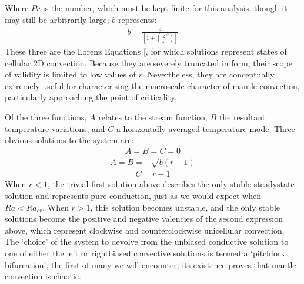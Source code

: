 \documentclass[letterpaper,10pt,english]{jupyterBook}
\begin{document}
\sphinxAtStartPar
Where \(Pr\) is the  number, which must be kept finite for this analysis, though it may still be arbitrarily large; \(b\) represents:
\begin{equation*}
\begin{split} b = \frac{4}{\left[ 1 + \left( \frac{2}{\lambda^*}^2 \right) \right]} \end{split}
\end{equation*}
\sphinxAtStartPar
These three are the Lorenz Equations {[}\sphinxcite{references:id75}{]}, for which solutions represent states of cellular 2D convection. Because they are severely truncated in form, their scope of validity is limited to low values of \(r\). Nevertheless, they are conceptually extremely useful for characterising the macro\sphinxhyphen{}scale character of mantle convection, particularly approaching the point of criticality.

\sphinxAtStartPar
Of the three functions, \(A\) relates to the stream function, \(B\) the resultant temperature variations, and \(C\) a horizontally averaged temperature mode. Three obvious solutions to the system are:
\begin{equation*}
\begin{split} A = B = C = 0 \end{split}
\end{equation*}\begin{equation*}
\begin{split} A = B = \pm \sqrt{b \left( r - 1 \right)} \end{split}
\end{equation*}\begin{equation*}
\begin{split} C = r - 1 \end{split}
\end{equation*}
\sphinxAtStartPar
When \(r<1\), the trivial first solution above describes the only stable steady\sphinxhyphen{}state solution and represents pure conduction, just as we would expect when \(Ra<Ra_{cr}\). When \(r>1\), this solution becomes unstable, and the only stable solutions become the positive and negative valencies of the second expression above, which represent clockwise and counterclockwise unicellular convection. The ‘choice’ of the system to devolve from the unbiased conductive solution to one of either the left\sphinxhyphen{} or right\sphinxhyphen{}biased convective solutions is termed a ‘pitchfork bifurcation’, the first of many we will encounter; its existence proves that mantle convection is chaotic.
\end{document}
